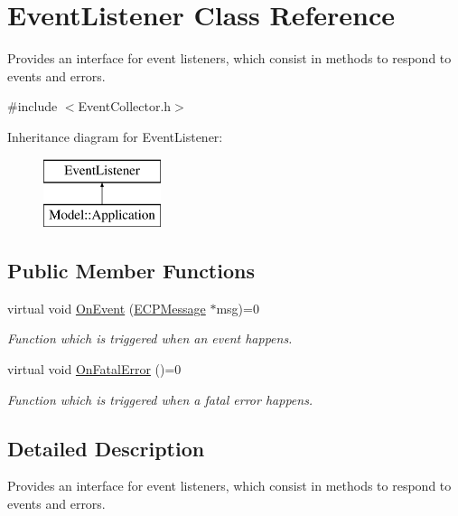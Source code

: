 \hypertarget{class_event_listener}{\section{Event\-Listener Class Reference}
\label{class_event_listener}
}


Provides an interface for event listeners, which consist in methods to respond to events and errors.  




{\ttfamily \#include $<$Event\-Collector.\-h$>$}

Inheritance diagram for Event\-Listener\-:\begin{figure}[H]
\begin{center}
\leavevmode
\includegraphics[height=2.000000cm]{class_event_listener}
\end{center}
\end{figure}
\subsection*{Public Member Functions}
\begin{DoxyCompactItemize}
\item 
virtual void \hyperlink{class_event_listener_a0e6f686e8d0abb100c3fbce37586b04b}{On\-Event} (\hyperlink{class_common_1_1_e_c_p_message}{E\-C\-P\-Message} $\ast$msg)=0
\begin{DoxyCompactList}\small\item\em Function which is triggered when an event happens. \end{DoxyCompactList}\item 
\hypertarget{class_event_listener_a77e58660b8b6910d36a961384032697e}{virtual void \hyperlink{class_event_listener_a77e58660b8b6910d36a961384032697e}{On\-Fatal\-Error} ()=0}\label{class_event_listener_a77e58660b8b6910d36a961384032697e}

\begin{DoxyCompactList}\small\item\em Function which is triggered when a fatal error happens. \end{DoxyCompactList}\end{DoxyCompactItemize}


\subsection{Detailed Description}
Provides an interface for event listeners, which consist in methods to respond to events and errors. 

